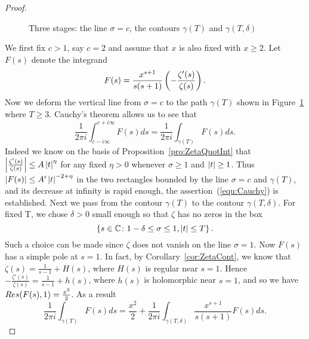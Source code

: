 \begin{proof}
\begin{figure}[!htb]
\caption{Three stages: the line $\sigma = c$, the contours $\gamma(T)$ and $\gamma(T, \delta)$}
\label{fig:ContourGamma2}
\end{figure}
	We first fix $c > 1$, say $c = 2$ and assume that $x$ is also fixed with $x \geq 2$. Let $F(s)$ denote the integrand
\begin{equation}\label{equ:Cauchy}
	F(s) = \frac{x^{s + 1}}{s(s + 1)} \left(-\frac{\zeta'(s)}{\zeta(s)}\right).
\end{equation}
	Now we deform the vertical line from $\sigma = c$ to the path $\gamma(T)$ shown in Figure~\ref{fig:ContourGamma2} where $T \geq 3$. Cauchy's theorem allows us to see that
\begin{equation*}
	\frac{1}{2 \pi i} \int _{c - i \infty} ^{c + i \infty} F(s) ds = \frac{1}{2 \pi i} \int _{\gamma(T)} F(s) ds.
\end{equation*}
	Indeed we know on the basis of Proposition~\ref{pro:ZetaQuotInt} that $\left|\frac{\zeta'(s)}{\zeta(s)}\right| \leq A\left|t\right|^\eta$ for any fixed $\eta > 0$ whenever $\sigma \geq 1$ and $\left|t\right| \geq 1$. Thus $\left|F(s)\right| \leq A'\left|t\right|^{-2 + \eta}$ in the two rectangles bounded by the line $\sigma = c$ and $\gamma(T)$, and its decrease at infinity is rapid enough, the assertion~(\ref{equ:Cauchy}) is established.
	Next we pass from the contour $\gamma(T)$ to the contour $\gamma(T, \delta)$. For fixed T, we chose $\delta > 0$ small enough so that $\zeta$ has no zeros in the box
\begin{equation*}
	\left\{s \in \mathbb{C} \colon 1 - \delta \leq \sigma \leq 1, \left|t\right| \leq T\right\}.
\end{equation*}
	Such a choice can be made since $\zeta$ does not vanish on the line $\sigma = 1$. Now $F(s)$ has a simple pole at $s = 1$. In fact, by Corollary~\ref{cor:ZetaCont}, we know that $\zeta(s) = \frac{1}{s - 1} + H(s)$, where $H(s)$ is regular near $s = 1$. Hence $-\frac{\zeta'(s)}{\zeta(s)} =\frac{1}{s - 1} + h(s)$, where $h(s)$ is holomorphic near $s = 1$, and so we have $\mathop{Res}(F(s), 1) = \frac{x^2}{2}$. As a result
\begin{equation*}
	\frac{1}{2 \pi i} \int _{\gamma(T)} F(s) ds = \frac{x^2}{2} + \frac{1}{2 \pi i} \int _{\gamma(T, \delta)} \frac{x^{s + 1}}{s(s + 1)} F(s) ds.

\end{equation*}
\end{proof}
